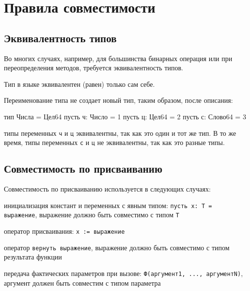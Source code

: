 \hypertarget{compat}{%
\section{Правила совместимости}\label{compat:chapter}}

\hypertarget{equal-types}{%
\subsection{Эквивалентность типов}\label{compat:equal-types}}

Во многих случаях, например, для большинства бинарных операция или при переопределения методов, требуется эквивалентность типов. 

Тип в языке \thelang{} эквивалентен (равен) только сам себе. 

Переименование типа не создает новый тип, таким образом, после описания: 
\begin{Trivil}
тип Числа = Цел64 
пусть ч: Число = 1
пусть ц: Цел64 = 2
пусть с: Слово64 = 3
\end{Trivil} 
типы переменных \verb+ч+ и \verb+ц+ эквивалентны, так как это один и тот же тип. В то же время, типы переменных \verb+с+ и \verb+ц+ не эквивалентны, так как это разные типы.

\hypertarget{compat-assign}{%
\subsection{Совместимость по присваиванию}\label{compat:assign}}

Совместимость по присваиванию используется в следующих случаях:
\begin{d_itemize}
\item
    инициализация констант и переменных с явным типом: \verb+пусть х: Т = выражение+, выражение должно быть совместимо с типом \verb+Т+
\item
    оператор присваивания: \verb+х := выражение+
\item
    оператор \verb+вернуть выражение+, выражение должно быть совместимо с типом результата функции
\item
    передача фактических параметров при вызове: \verb+Ф(аргумент1, ..., аргументN)+, аргумент должен быть совместим с типом параметра
\end{d_itemize}

